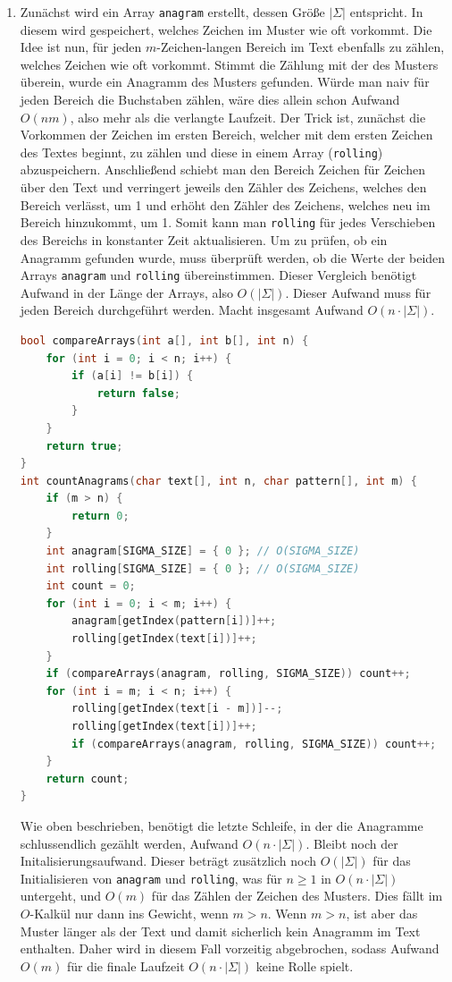 \documentclass[11pt,a4paper]{article}
\begin{document}
\begin{loesung}
\begin{enumerate}
        \item
        Zunächst wird ein Array \texttt{anagram} erstellt, dessen Größe $|\Sigma|$ entspricht.
        In diesem wird gespeichert, welches Zeichen im Muster wie oft vorkommt.
        Die Idee ist nun, für jeden $m$-Zeichen-langen Bereich im Text ebenfalls zu zählen, welches Zeichen wie oft vorkommt.
        Stimmt die Zählung mit der des Musters überein, wurde ein Anagramm des Musters gefunden.
        Würde man naiv für jeden Bereich die Buchstaben zählen, wäre dies allein schon Aufwand $O(nm)$, also mehr als die verlangte Laufzeit.
        Der Trick ist, zunächst die Vorkommen der Zeichen im ersten Bereich, welcher mit dem ersten Zeichen des Textes beginnt, zu zählen und diese in einem Array (\texttt{rolling}) abzuspeichern.
        Anschließend schiebt man den Bereich Zeichen für Zeichen über den Text und verringert jeweils den Zähler des Zeichens, welches den Bereich verlässt, um 1 und erhöht den Zähler des Zeichens, welches neu im Bereich hinzukommt, um 1.
        Somit kann man \texttt{rolling} für jedes Verschieben des Bereichs  in konstanter Zeit aktualisieren.
        Um zu prüfen, ob ein Anagramm gefunden wurde, muss überprüft werden, ob die Werte der beiden Arrays \texttt{anagram} und \texttt{rolling} übereinstimmen.
        Dieser Vergleich benötigt Aufwand in der Länge der Arrays, also $O(|\Sigma|)$.
        Dieser Aufwand muss für jeden Bereich durchgeführt werden.
        Macht insgesamt Aufwand $O(n\cdot|\Sigma|)$.
        \begin{lstlisting}[language=c++]
bool compareArrays(int a[], int b[], int n) {
    for (int i = 0; i < n; i++) {
        if (a[i] != b[i]) {
            return false;
        }
    }
    return true;
}
int countAnagrams(char text[], int n, char pattern[], int m) {
    if (m > n) {
        return 0;
    }
    int anagram[SIGMA_SIZE] = { 0 }; // O(SIGMA_SIZE)
    int rolling[SIGMA_SIZE] = { 0 }; // O(SIGMA_SIZE)
    int count = 0;
    for (int i = 0; i < m; i++) {
        anagram[getIndex(pattern[i])]++;
        rolling[getIndex(text[i])]++;
    }
    if (compareArrays(anagram, rolling, SIGMA_SIZE)) count++;
    for (int i = m; i < n; i++) {
        rolling[getIndex(text[i - m])]--;
        rolling[getIndex(text[i])]++;
        if (compareArrays(anagram, rolling, SIGMA_SIZE)) count++;
    }
    return count;
}
        \end{lstlisting}
        Wie oben beschrieben, benötigt die letzte Schleife, in der die Anagramme schlussendlich gezählt werden, Aufwand $O(n \cdot |\Sigma|)$.
        Bleibt noch der Initalisierungsaufwand.
        Dieser beträgt zusätzlich noch $O(|\Sigma|)$ für das Initialisieren von \texttt{anagram} und \texttt{rolling}, was für $n \geq 1$ in $O(n\cdot |\Sigma|)$ untergeht, und $O(m)$ für das Zählen der Zeichen des Musters.
        Dies fällt im $O$-Kalkül nur dann ins Gewicht, wenn $m > n$.
        Wenn $m > n$, ist aber das Muster länger als der Text und damit sicherlich kein Anagramm im Text enthalten.
        Daher wird in diesem Fall vorzeitig abgebrochen, sodass Aufwand $O(m)$ für die finale Laufzeit $O(n \cdot |\Sigma|)$ keine Rolle spielt.


\end{enumerate}
\end{loesung}
\end{document}
